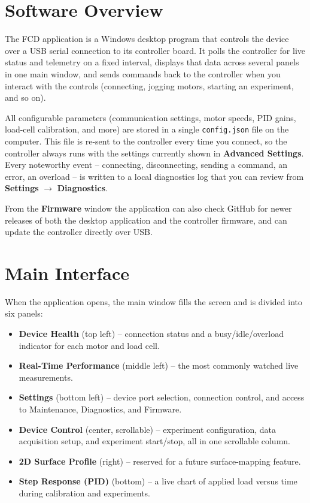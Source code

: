 \documentclass[12pt]{report}
\begin{document}
\section{Software Overview}
The FCD application is a Windows desktop program that controls the device over a USB serial connection to its controller board. It polls the controller for live status and telemetry on a fixed interval, displays that data across several panels in one main window, and sends commands back to the controller when you interact with the controls (connecting, jogging motors, starting an experiment, and so on).

All configurable parameters (communication settings, motor speeds, PID gains, load-cell calibration, and more) are stored in a single \texttt{config.json} file on the computer. This file is re-sent to the controller every time you connect, so the controller always runs with the settings currently shown in \textbf{Advanced Settings}. Every noteworthy event -- connecting, disconnecting, sending a command, an error, an overload -- is written to a local diagnostics log that you can review from \textbf{Settings} $\rightarrow$ \textbf{Diagnostics}.

From the \textbf{Firmware} window the application can also check GitHub for newer releases of both the desktop application and the controller firmware, and can update the controller directly over USB.

\section{Main Interface}
When the application opens, the main window fills the screen and is divided into six panels:

\begin{itemize}
    \item \textbf{Device Health} (top left) -- connection status and a busy/idle/overload indicator for each motor and load cell.
    \item \textbf{Real-Time Performance} (middle left) -- the most commonly watched live measurements.
    \item \textbf{Settings} (bottom left) -- device port selection, connection control, and access to Maintenance, Diagnostics, and Firmware.
    \item \textbf{Device Control} (center, scrollable) -- experiment configuration, data acquisition setup, and experiment start/stop, all in one scrollable column.
    \item \textbf{2D Surface Profile} (right) -- reserved for a future surface-mapping feature.
    \item \textbf{Step Response (PID)} (bottom) -- a live chart of applied load versus time during calibration and experiments.
\end{itemize}
\end{document}
